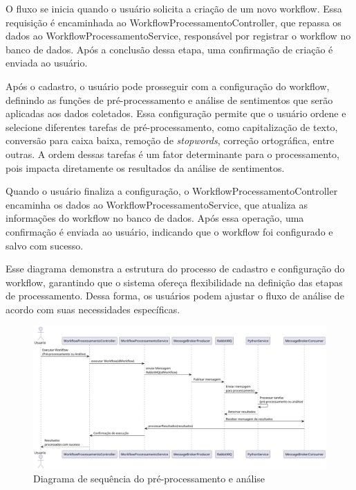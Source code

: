 \documentclass[
	12pt,				%
	oneside,			%
	a4paper,			%
	english,			%
	french,				%
	spanish,			%
	brazil				%
	]{abntex2}
\begin{document}
O fluxo se inicia quando o usuário solicita a criação de um novo
workflow. Essa requisição é encaminhada ao
WorkflowProcessamentoController, que repassa os dados ao
WorkflowProcessamentoService, responsável por registrar o workflow no
banco de dados. Após a conclusão dessa etapa, uma confirmação de criação
é enviada ao usuário.

Após o cadastro, o usuário pode prosseguir com a configuração do
workflow, definindo as funções de pré-processamento e análise de
sentimentos que serão aplicadas aos dados coletados. Essa configuração
permite que o usuário ordene e selecione diferentes tarefas de
pré-processamento, como capitalização de texto, conversão para caixa
baixa, remoção de \emph{stopwords}, correção ortográfica, entre outras.
A ordem dessas tarefas é um fator determinante para o processamento,
pois impacta diretamente os resultados da análise de sentimentos.

Quando o usuário finaliza a configuração, o
WorkflowProcessamentoController encaminha os dados ao
WorkflowProcessamentoService, que atualiza as informações do workflow no
banco de dados. Após essa operação, uma confirmação é enviada ao
usuário, indicando que o workflow foi configurado e salvo com sucesso.

Esse diagrama demonstra a estrutura do processo de cadastro e
configuração do workflow, garantindo que o sistema ofereça flexibilidade
na definição das etapas de processamento. Dessa forma, os usuários podem
ajustar o fluxo de análise de acordo com suas necessidades específicas.

\begin{figure}[htbp]
\hypertarget{seq_processamento_analise}{%
\caption{Diagrama de sequência do pré-processamento e análise}\label{seq_processamento_analise}
\begin{center}
\includegraphics[scale=0.35]{imagens/sentilytics/diagramas/sequencia-pre-processamento-analise-sentimentos.png}
\end{center}
}
\end{figure}
\end{document}
